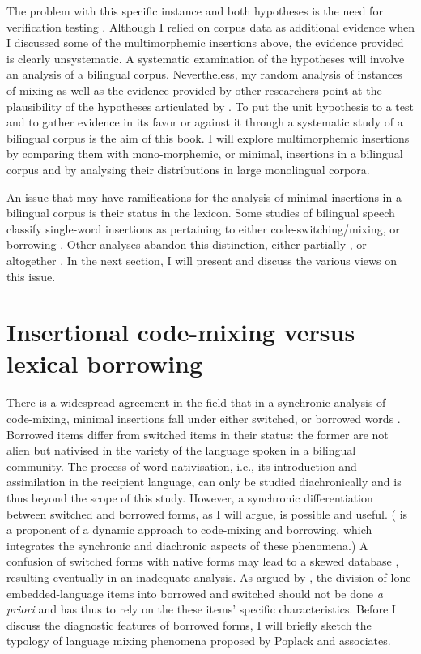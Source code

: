 The problem with this specific instance and both hypotheses is the need for verification testing \citep[cf.][42]{wray-2002}. Although I relied on corpus data as additional evidence when I discussed some of the multimorphemic insertions above, the evidence provided is clearly unsystematic. A systematic examination of the hypotheses will involve an analysis of a bilingual corpus. Nevertheless, my random analysis of instances of mixing as well as the evidence provided by other researchers point at the plausibility of the hypotheses articulated by \citet{backus-units-2003}. To put the unit hypothesis to a test and to gather evidence in its favor or against it through a systematic study of a bilingual corpus is the aim of this book. I will explore multimorphemic insertions by comparing them with mono-morphemic, or minimal, insertions in a bilingual corpus and by analysing their distributions in large monolingual corpora.

An issue that may have ramifications for the analysis of minimal insertions in a bilingual corpus is their status in the lexicon. Some studies of bilingual speech classify single-word insertions as pertaining to either code-switching/mixing, or borrowing \citep[e.g.,][]{poplack18}. Other analyses abandon this distinction, either partially \citep[e.g.,][78-81]{muysken-bilingual-2000}, or altogether \citep[e.g][]{backus-13,backus-cs-15}. In the next section, I will present and discuss the various views on this issue.

\section{Insertional code-mixing versus lexical borrowing}\label{CM-borrowing}

There is a widespread agreement in the field that in a synchronic analysis of code-mixing, minimal insertions fall under either switched, or borrowed words  \citep[e.g.,][]{haugen-1953-vol1,poplack-etal-1988, myers-scotton-duelling-1993,milroy-code-switching-1995,thomason-language-2001}. Borrowed items differ from switched items in their status: the former are not alien but nativised in the variety of the language spoken in a bilingual community. The process of word nativisation, i.e., its introduction and assimilation in the recipient language, can only be studied diachronically \citep[cf.][]{poplack-dion-2012} and is thus beyond the scope of this study. However, a synchronic differentiation between switched and borrowed forms, as I will argue, is possible and useful. (\citealt{backus-cs-15} is a proponent of a dynamic approach to code-mixing and borrowing, which integrates the synchronic and  diachronic aspects of these phenomena.) A confusion of switched forms with native forms may lead to a skewed database \citep[164]{myers-scotton-duelling-1993}, resulting eventually in an inadequate analysis. As argued by \citet{poplack-comment-2011}, the division of lone embedded-language items into borrowed and switched should not be done \textit{a priori} and has thus to rely on the these items' specific characteristics. Before I discuss the diagnostic features of borrowed forms, I will briefly sketch the typology of language mixing phenomena proposed by Poplack and associates. 

